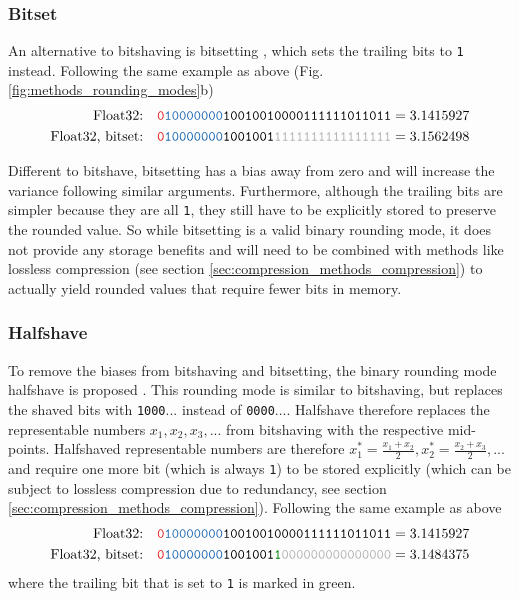 \subsubsection{Bitset}
An alternative to bitshaving is bitsetting \citep{Zender2016}, which sets the trailing bits to \texttt{1} instead. Following the same
example as above (Fig. \ref{fig:methods_rounding_modes}b)
\begin{align}
	\text{Float32:}& \quad \mathtt{{\color{psign}0}{\color{pexpo}10000000}10010010000111111011011} = 3.1415927 \nonumber \\
	\text{Float32, bitset:}& \quad \mathtt{{\color{psign}0}{\color{pexpo}10000000}1001001{\color{gray}1111111111111111}} = 3.1562498
	\label{eq:bitset}
\end{align}

Different to bitshave, bitsetting has a bias away from zero and will increase the variance following similar arguments. Furthermore,
although the trailing bits are simpler because they are all \texttt{1}, they still have to be explicitly stored to preserve the rounded
value. So while bitsetting is a valid binary rounding mode, it does not provide any storage benefits and will need to be combined
with methods like lossless compression (see section \ref{sec:compression_methods_compression}) to actually yield rounded
values that require fewer bits in memory.

\subsubsection{Halfshave}
To remove the biases from bitshaving and bitsetting, the binary rounding mode halfshave is proposed \citep{Zender2016,Kouznetsov2020}.
This rounding mode is similar to bitshaving, but replaces the shaved bits with \texttt{1000$...$} instead of \texttt{0000$...$}.
Halfshave therefore replaces the representable numbers $x_1,x_2,x_3,...$ from bitshaving with the respective mid-points.
Halfshaved representable numbers are therefore $x_1^* = \tfrac{x_1+x_2}{2}, x_2^* = \tfrac{x_2 + x_3}{2}, ...$ and require
one more bit (which is always \texttt{1}) to be stored explicitly (which can be subject to lossless compression due to redundancy,
see section \ref{sec:compression_methods_compression}). Following the same example as above
\begin{align}
	\text{Float32:}& \quad \mathtt{{\color{psign}0}{\color{pexpo}10000000}10010010000111111011011} = 3.1415927 \nonumber \\
	\text{Float32, bitset:}& \quad \mathtt{{\color{psign}0}{\color{pexpo}10000000}1001001{\color{mygreen}1}
	{\color{gray}000000000000000}} = 3.1484375
	\label{eq:halfshave}
\end{align}
where the trailing bit that is set to \texttt{1} is marked in green. 

